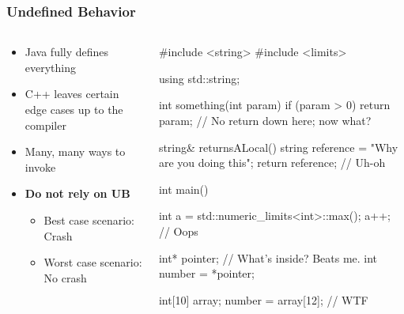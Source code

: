 \documentclass[glossy]{beamer}
\begin{document}
\begin{frame}[fragile=singleslide]
  \frametitle{Undefined Behavior}
  \begin{columns}
    \begin{column}{6cm}
      \begin{itemize}
        \item Java fully defines everything
        \item C++ leaves certain edge cases up to the compiler
        \item Many, many ways to invoke
        \item \textbf{Do not rely on UB}
        \begin{itemize}
          \item Best case scenario: Crash
          \item Worst case scenario: No crash
        \end{itemize}
      \end{itemize}
    \end{column}

    \begin{column}{6cm}
      \begin{cppcode}
#include <string>
#include <limits>

using std::string;

int something(int param) { 
  if (param > 0) return param; 
  // No return down here; now what? 
} 

string& returnsALocal() { 
  string reference = "Why are you doing this"; 
  return reference; // Uh-oh 
} 

int main() { 
  int a = std::numeric_limits<int>::max(); 
  a++; // Oops 

  int* pointer; // What's inside?  Beats me.
  int number = *pointer;

  int[10] array; 
  number = array[12]; // WTF 
}
      \end{cppcode}
    \end{column}
  \end{columns}
\end{frame}
\end{document}
